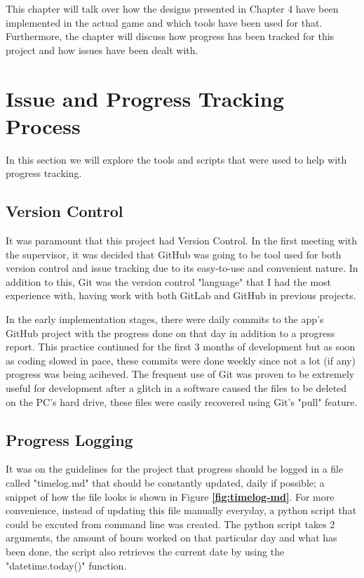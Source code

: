 \documentclass{dissertation}
\begin{document}
This chapter will talk over how the designs presented in Chapter 4 have been implemented in the actual game and which tools have been used for that. Furthermore, the chapter will discuss how progress has been tracked for this project and how issues have been dealt with.

\section{Issue and Progress Tracking Process}

In this section we will explore the tools and scripts that were used to help with progress tracking.

\subsection{Version Control}
It was paramount that this project had Version Control. In the first meeting with the supervisor, it was decided that GitHub was going to be tool used for both version control and issue tracking due to its easy-to-use and convenient nature. In addition to this, Git was the version control "language" that I had the most experience with, having work with both GitLab and GitHub in previous projects. 

In the early implementation stages, there were daily commits to the app's GitHub project with the progress done on that day in addition to a progress report. This practice continued for the first 3 months of development but as soon as coding slowed in pace, these commits were done weekly since not a lot (if any) progress was being aciheved. The frequent use of Git was proven to be extremely useful for development after a glitch in a software caused the files to be deleted on the PC's hard drive, these files were easily recovered using Git's "pull" feature.

\subsection{Progress Logging}
It was on the guidelines for the project that progress should be logged in a file called "timelog.md" that should be constantly updated, daily if possible; a snippet of how the file looks is shown in Figure \textbf{\ref{fig:timelog-md}}. For more convenience, instead of updating this file manually everyday, a python script that could be excuted from command line was created. The python script takes 2 arguments, the amount of hours worked on that particular day and what has been done, the script also retrieves the current date by using the "datetime.today()" function.
\end{document}
